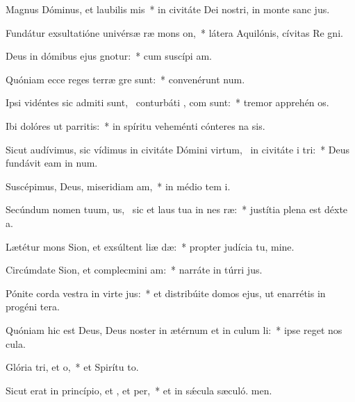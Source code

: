 \item Magnus Dóminus, et laubilis mis~* in civitáte Dei nostri, in monte sanc jus.
\item Fundátur exsultatióne univérsæ ræ mons on,~* látera Aquilónis, cívitas Re gni.
\item Deus in dómibus ejus gnotur:~* cum suscípi am.
\item Quóniam ecce reges terræ gre sunt:~* convenérunt  num.
\item Ipsi vidéntes sic admiti sunt,~\pscross{} conturbáti , com sunt:~* tremor apprehén os.
\item Ibi dolóres ut parritis:~* in spíritu veheménti cónteres na sis.
\item Sicut audívimus, sic vídimus in civitáte Dómini virtum,~\pscross{} in civitáte i tri:~* Deus fundávit eam in num.
\item Suscépimus, Deus, miseridiam am,~* in médio tem i.
\item Secúndum nomen tuum, us,~\pscross{} sic et laus tua in nes ræ:~* justítia plena est déxte a.
\item Lætétur mons Sion, et exsúltent liæ dæ:~* propter judícia tu, mine.
\item Circúmdate Sion, et complecmini am:~* narráte in túrri jus.
\item Pónite corda vestra in virte jus:~* et distribúite domos ejus, ut enarrétis in progéni tera.
\item Quóniam hic est Deus, Deus noster in ætérnum et in culum li:~* ipse reget nos  cula.
\item Glória tri, et o,~* et Spirítu to.
\item Sicut erat in princípio, et , et per,~* et in sǽcula sæculó. men.
